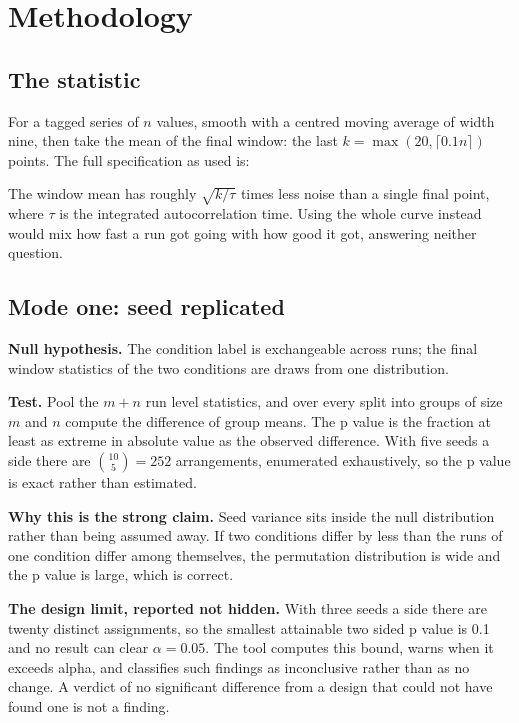 \documentclass[11pt,a4paper]{report}
\begin{document}
\chapter{Methodology}
\label{ch:methodology}

\section{The statistic}

For a tagged series of $n$ values, smooth with a centred moving average of width
nine, then take the mean of the final window: the last
$k = \max(20, \lceil 0.1n \rceil)$ points. The full specification as used is:

\begin{quote}\small\factstatistic\end{quote}

The window mean has roughly $\sqrt{k/\tau}$ times less noise than a single final
point, where $\tau$ is the integrated autocorrelation time. Using the whole curve
instead would mix how fast a run got going with how good it got, answering
neither question.

\section{Mode one: seed replicated}

\textbf{Null hypothesis.} The condition label is exchangeable across runs; the
final window statistics of the two conditions are draws from one distribution.

\textbf{Test.} Pool the $m+n$ run level statistics, and over every split into
groups of size $m$ and $n$ compute the difference of group means. The p value is
the fraction at least as extreme in absolute value as the observed difference.
With five seeds a side there are $\binom{10}{5} = 252$ arrangements, enumerated
exhaustively, so the p value is exact rather than estimated.

\textbf{Why this is the strong claim.} Seed variance sits inside the null
distribution rather than being assumed away. If two conditions differ by less
than the runs of one condition differ among themselves, the permutation
distribution is wide and the p value is large, which is correct.

\textbf{The design limit, reported not hidden.} With three seeds a side there are
twenty distinct assignments, so the smallest attainable two sided p value is 0.1
and no result can clear $\alpha = 0.05$. The tool computes this bound, warns when
it exceeds alpha, and classifies such findings as inconclusive rather than as no
change. A verdict of no significant difference from a design that could not have
found one is not a finding.
\end{document}
